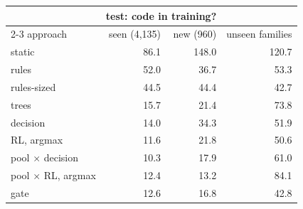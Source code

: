 \begin{tabular}{@{}lrrr@{}}
\toprule
& \multicolumn{2}{c}{test: code in training?} & \\
\cmidrule(lr){2-3}
approach & seen (4,135) & new (960) & unseen families \\
\midrule
static & 86.1 & 148.0 & 120.7 \\
rules & 52.0 & 36.7 & 53.3 \\
rules-sized & 44.5 & 44.4 & 42.7 \\
trees & 15.7 & 21.4 & 73.8 \\
decision & 14.0 & 34.3 & 51.9 \\
RL, argmax & 11.6 & 21.8 & 50.6 \\
pool $\times$ decision & 10.3 & 17.9 & 61.0 \\
pool $\times$ RL, argmax & 12.4 & 13.2 & 84.1 \\
gate & 12.6 & 16.8 & 42.8 \\
\bottomrule
\end{tabular}
